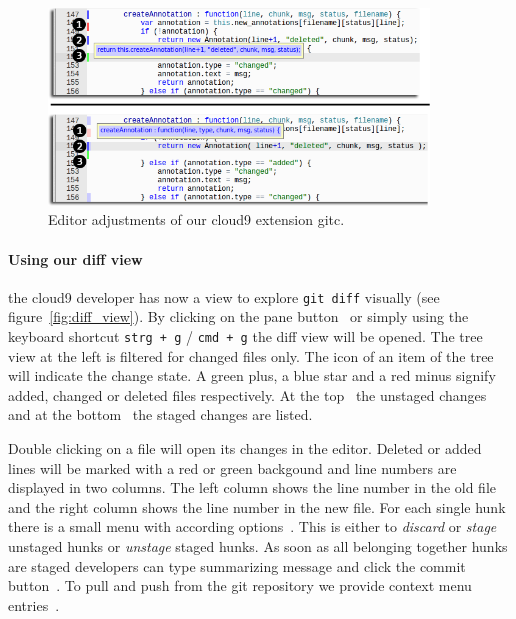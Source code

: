 \begin{figure}
   \centering
   \includegraphics[width=0.9\textwidth]{images/extension_tooltip_comparison.png}
   \caption{Editor adjustments of our cloud9 extension gitc.}
   \label{fig:editor}
\end{figure}

\paragraph{Using our diff view} the cloud9 developer has now a view to explore \texttt{git diff} visually (see figure~\ref{fig:diff_view}).
By clicking on the pane button~ or simply using the keyboard shortcut \texttt{strg + g} / \texttt{cmd + g} the diff view will be opened.
The tree view at the left is filtered for changed files only.
The icon of an item of the tree will indicate the change state.
A green plus, a blue star and a red minus signify added, changed or deleted files respectively.
At the top~ the unstaged changes and at the bottom~ the staged changes are listed.

Double clicking on a file will open its changes in the editor.
Deleted or added lines will be marked with a red or green backgound and line numbers are displayed in two columns.
The left column shows the line number in the old file and the right column shows the line number in the new file.
For each single hunk there is a small menu with according options~.
This is either to \emph{discard} or \emph{stage} unstaged hunks or \emph{unstage} staged hunks.
As soon as all belonging together hunks are staged developers can type summarizing message and click the commit button~.
To pull and push from the git repository we provide context menu entries~.

